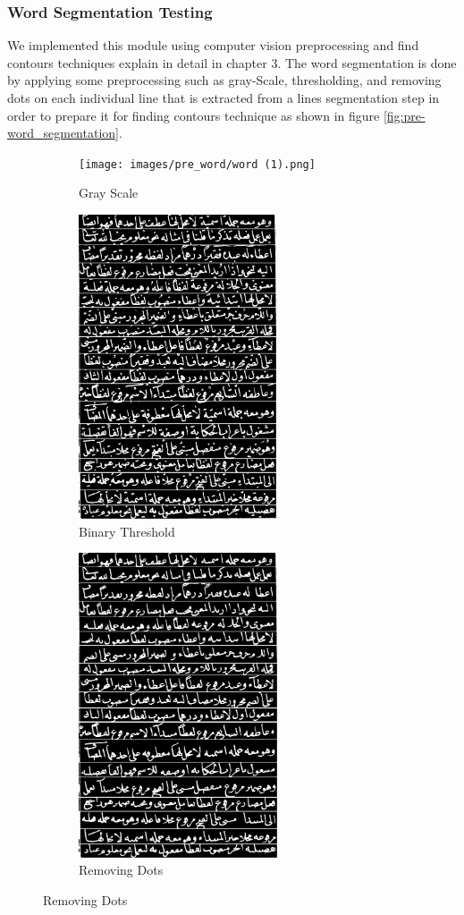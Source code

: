\subsubsection{Word Segmentation Testing}
We implemented this module using computer vision preprocessing and find contours techniques explain in detail in chapter 3. The word segmentation is done by applying some preprocessing such as gray-Scale, thresholding, and removing dots on each individual line that is extracted from a lines segmentation step in order to prepare it for finding contours technique as shown in figure \ref{fig:pre-word_segmentation}.
\begin{figure}[H]
     \centering%
     \begin{subfigure}[b]{0.3\textwidth}
         \centering
         \texttt{[image: images/pre\_word/word (1).png]}
         \caption{Gray Scale}
         \label{fig:test-word_Gray_Scale}
     \end{subfigure}
     \hfill
      \begin{subfigure}[b]{0.3\textwidth}
         \centering
         \includegraphics[width=\textwidth, height=9cm]{images/pre_word/word2.png}
         \caption{Binary Threshold}
         \label{fig:test-word_Binary}
     \end{subfigure}
     \hfill%
      \begin{subfigure}[b]{0.3\textwidth}
         \centering
         \includegraphics[width=\textwidth, height=9cm]{images/pre_word/word3.png}
         \caption{Removing Dots}
         \label{fig:test_Removing-Dots}
     \end{subfigure}


\end{figure}
